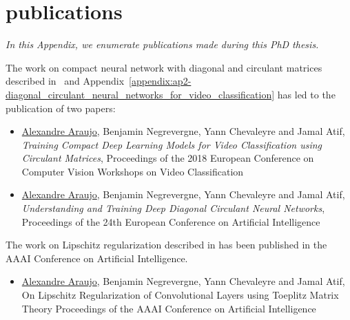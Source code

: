\chapter{publications}
\label{appendix:ap6-publications}

\noindent
\emph{In this Appendix, we enumerate publications made during this PhD thesis.}
\vspace{0.4cm}

\noindent
The work on compact neural network with diagonal and circulant matrices described in~ and Appendix~\ref{appendix:ap2-diagonal_circulant_neural_networks_for_video_classification} has led to the publication of two papers:
\begin{itemize}[topsep=0pt,leftmargin=12pt]
  \setlength\itemsep{-0.3em}
  \item 
    \underline{Alexandre Araujo}, Benjamin Negrevergne, Yann Chevaleyre and Jamal Atif,
    \emph{Training Compact Deep Learning Models for Video Classification using Circulant Matrices},
    Proceedings of the 2018 European Conference on Computer Vision Workshops on Video Classification 
  \item
    \underline{Alexandre Araujo}, Benjamin Negrevergne, Yann Chevaleyre and Jamal Atif,
    \emph{Understanding and Training Deep Diagonal Circulant Neural Networks},
    Proceedings of the 24th European Conference on Artificial Intelligence
\end{itemize}

\vspace{0.4cm}
\noindent
The work on Lipschitz regularization described in  has been published in the  AAAI Conference on Artificial Intelligence.
\begin{itemize}[topsep=0pt,leftmargin=12pt]
  \item 
    \underline{Alexandre Araujo}, Benjamin Negrevergne, Yann Chevaleyre and Jamal Atif,
    On Lipschitz Regularization of Convolutional Layers using Toeplitz Matrix Theory
    Proceedings of the AAAI Conference on Artificial Intelligence
\end{itemize}

